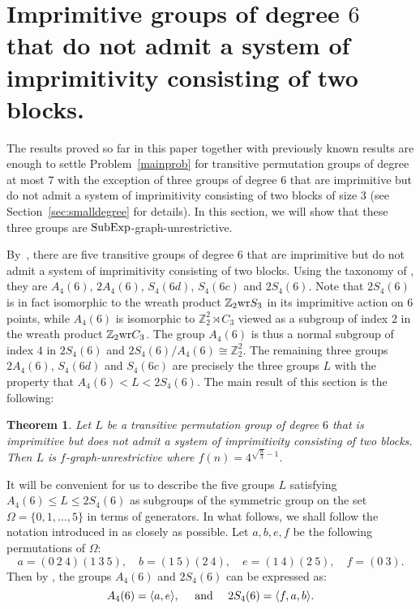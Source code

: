 \documentclass{amsart}
\newtheorem{theorem}{Theorem}
\theoremstyle{definition}
\begin{document}
\section{Imprimitive groups of degree $6$ that do not admit a system of imprimitivity consisting of two blocks.}
\label{deg6}

The results proved so far in this paper together with previously known results are enough to settle  Problem~\ref{mainprob} for transitive permutation groups of degree at most $7$ with the exception of three groups of degree $6$ that are imprimitive but do not admit a system of imprimitivity consisting of two blocks of size $3$ (see Section~\ref{sec:smalldegree} for details). In this section, we will show that these three groups are ${\mathop{\rm SubExp}}$-graph-unrestrictive.

By~\cite{conway}, there are five transitive groups of degree $6$ that are imprimitive but do not admit a system of imprimitivity consisting of two blocks. Using the taxonomy of \cite{conway}, they are $A_4(6)$, $2A_4(6)$, $S_4(6d)$, $S_4(6c)$ and $2S_4(6)$. Note that $2S_4(6)$ is in fact isomorphic to the wreath product ${\mathbb Z}_2{\mathop{\rm wr}} S_3$ in its imprimitive action on $6$ points, while $A_4(6)$ is isomorphic to ${\mathbb Z}_2^2\rtimes C_3$ viewed as a subgroup of index $2$ in the wreath product ${\mathbb Z}_2{\mathop{\rm wr}} C_3$. The group $A_4(6)$ is thus a normal subgroup of index $4$ in $2S_4(6)$ and $2S_4(6)/A_4(6) \cong {\mathbb Z}_2^2$. The remaining three groups $2A_4(6)$, $S_4(6d)$ and $S_4(6c)$ are precisely the three groups $L$ with the property that $A_4(6) < L < 2S_4(6)$. The main result of this section is the following:
\begin{theorem}
\label{thm:deg6}
Let $L$ be a transitive permutation group of degree $6$ that is imprimitive but does not admit a system of imprimitivity consisting of two blocks. Then $L$ is $f$-graph-unrestrictive where $f(n)=4^{\sqrt{\frac{n}{3}}-1}$.
\end{theorem}

It will be convenient for us to describe the five groups $L$ satisfying $A_4(6)\le L \le 2S_4(6)$ as subgroups of the symmetric group on the set $\Omega=\{0,1,\ldots, 5\}$ in terms of generators. In what follows, we shall follow the notation introduced in \cite{conway} as closely as possible. Let $a,b,e,f$ be the following permutations of $\Omega$:
\begin{equation}
\label{eqn:abef}
 a = (0~2~4)(1~3~5),\quad
b = (1~5)(2~4),\quad
e = (1~4)(2~5),\quad
f = (0~3).
\end{equation}
Then by \cite[Appendix A]{conway}, the groups $A_4(6)$ and $2S_4(6)$ can be expressed as:
\begin{equation}
\label{eqn:LL}
A_4(6) = {\langle} a, e {\rangle}, \quad
\hbox{ and } \quad
2S_4(6) = {\langle} f,a,b {\rangle}.
\end{equation}
\end{document}
